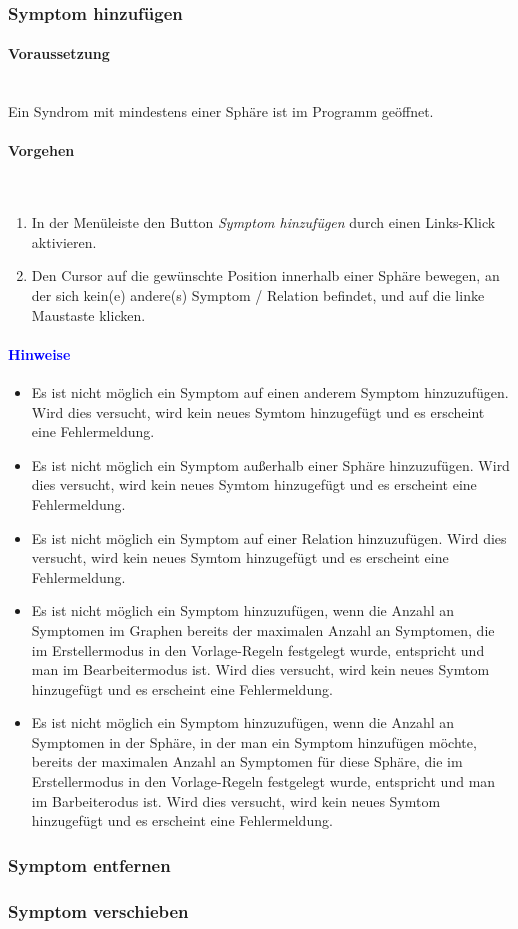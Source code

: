 \documentclass[enabledeprecatedfontcommands,fontsize=11pt,paper=a4,twoside]{scrartcl}
\newcommand*{\hint}{\paragraph{\textcolor{blue}{Hinweise}}}
\newcommand*{\condition}{\paragraph{Voraussetzung}$\;$ \vspace{0.2cm}\\}
\newcommand*{\actions}{\paragraph{Vorgehen} $\;$\vspace{0.2cm}\\}
\begin{document}
		\subsubsection{Symptom hinzufügen}
		\condition 	
		Ein Syndrom mit mindestens einer Sphäre ist im Programm geöffnet. 
		\actions
		\begin{enumerate}
			\item In der Menüleiste den Button \textit{Symptom hinzufügen} durch einen Links-Klick aktivieren.
			\item Den Cursor auf die gewünschte Position innerhalb einer Sphäre bewegen, an der sich kein(e) andere(s) Symptom / Relation befindet, und auf die linke Maustaste klicken.
		\end{enumerate}
		\hint
		\begin{itemize}
			\item Es ist nicht möglich ein Symptom auf einen anderem Symptom hinzuzufügen. Wird dies versucht, wird kein neues Symtom hinzugefügt und es erscheint eine Fehlermeldung.
			\item Es ist nicht möglich ein Symptom außerhalb einer Sphäre hinzuzufügen. Wird dies versucht, wird kein neues Symtom hinzugefügt und es erscheint eine Fehlermeldung.
			\item Es ist nicht möglich ein Symptom auf einer Relation hinzuzufügen. Wird dies versucht, wird kein neues Symtom hinzugefügt und es erscheint eine Fehlermeldung.
			\item Es ist nicht möglich ein Symptom hinzuzufügen, wenn die Anzahl an Symptomen im Graphen bereits der maximalen Anzahl an Symptomen, die im Erstellermodus in den Vorlage-Regeln festgelegt wurde, entspricht und man im Bearbeitermodus ist. Wird dies versucht, wird kein neues Symtom hinzugefügt und es erscheint eine Fehlermeldung.
			\item Es ist nicht möglich ein Symptom hinzuzufügen, wenn die Anzahl an Symptomen in der Sphäre, in der man ein Symptom hinzufügen möchte, bereits der maximalen Anzahl an Symptomen für diese Sphäre, die im Erstellermodus in den Vorlage-Regeln festgelegt wurde, entspricht und man im Barbeiterodus ist. Wird dies versucht, wird kein neues Symtom hinzugefügt und es erscheint eine Fehlermeldung.		
		\end{itemize}
		\newpage
		\subsubsection{Symptom entfernen}
		\subsubsection{Symptom verschieben}
\end{document}
